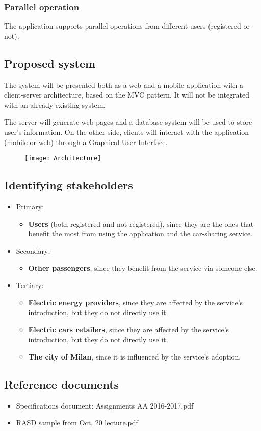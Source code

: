 \subsubsection{Parallel operation}
The application supports parallel operations from different users (registered or not).
\newpage
\subsection{Proposed system}
The system will be presented both as a web and a mobile application with a client-server architecture, based on the MVC pattern. It will not be integrated with an already existing system. 

The server will generate web pages and a database system will be used to store user's information. On the other side, clients will interact with the application (mobile or web) through a Graphical User Interface.
\begin{figure}[H]
	\centering
	\texttt{[image: Architecture]}
\end{figure}
\newpage
\subsection{Identifying stakeholders}
\begin{itemize}
	\item Primary: 
	\begin{itemize}
		\item \textbf{Users} (both registered and not registered), since they are the ones that benefit the most from using the application and the car-sharing service.
	\end{itemize}  
	\item Secondary: 
	\begin{itemize}
		\item \textbf{Other passengers}, since they benefit from the service via someone else.
	\end{itemize}
	\item Tertiary:
	\begin{itemize}
		\item \textbf{Electric energy providers}, since they are affected by the service's introduction, but they do not directly use it.
		\item \textbf{Electric cars retailers}, since they are affected by the service's introduction, but they do not directly use it.
		\item \textbf{The city of Milan}, since it is influenced by the service's adoption.
	\end{itemize}
\end{itemize}
\subsection{Reference documents}
\begin{itemize}
	\item Specifications document: Assignments AA 2016-2017.pdf
	\item RASD sample from Oct. 20 lecture.pdf
\end{itemize}